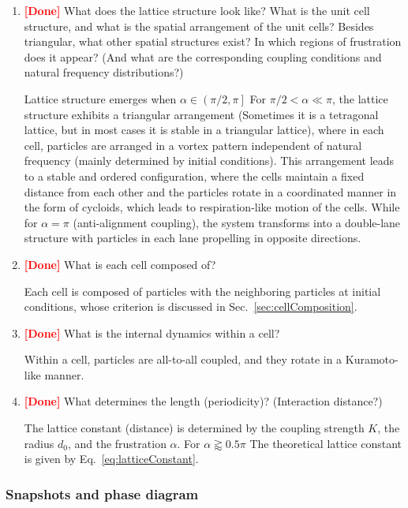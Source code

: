 \documentclass{article}
\begin{document}
\begin{enumerate}
    \item \textbf{\textcolor{red}{[Done]}} What does the lattice structure look like? What is the unit cell structure, and what is the spatial arrangement of the unit cells? Besides triangular, what other spatial structures exist? In which regions of frustration does it appear? (And what are the corresponding coupling conditions and natural frequency distributions?)
    
        Lattice structure emerges when $\alpha\in\left(\pi/2, \pi\right]$
        For $\pi/2<\alpha\ll\pi$, the lattice structure exhibits a triangular arrangement (Sometimes it is a tetragonal lattice, but in most cases it is stable in a triangular lattice), where in each cell, particles are arranged in a vortex pattern independent of natural frequency (mainly determined by initial conditions). This arrangement leads to a stable and ordered configuration, where the cells maintain a fixed distance from each other and the particles rotate in a coordinated manner in the form of cycloids, which leads to respiration-like motion of the cells.
        While for $\alpha=\pi$ (anti-alignment coupling), the system transforms into a double-lane structure with particles in each lane propelling in opposite directions. 
    \item \textbf{\textcolor{red}{[Done]}} What is each cell composed of?
    
        Each cell is composed of particles with the neighboring particles at initial conditions, whose criterion is discussed in Sec.~\ref{sec:cellComposition}. 
    \item \textbf{\textcolor{red}{[Done]}} What is the internal dynamics within a cell?
    
        Within a cell, particles are all-to-all coupled, and they rotate in a Kuramoto-like manner.
    \item \textbf{\textcolor{red}{[Done]}} What determines the length (periodicity)? (Interaction distance?)

        The lattice constant (distance) is determined by the coupling strength $K$, the radius $d_0$, and the frustration $\alpha$. For $\alpha\gtrapprox0.5\pi$ The theoretical lattice constant is given by Eq.~\eqref{eq:latticeConstant}. 
\end{enumerate}

\newpage
\subsubsection{Snapshots and phase diagram}
\end{document}
